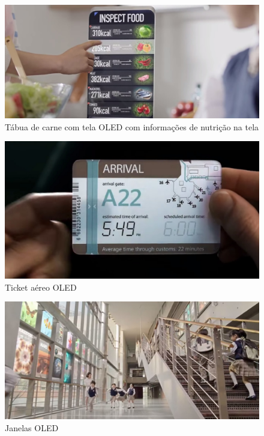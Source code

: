 \begin{figure}[!ht]
  \centering
  \includegraphics[width=.90\textwidth]{./figuras/oled-future4} 
  \caption{Tábua de carne com tela OLED com informações de nutrição na tela}
  \label{fig:oled-future4} 
\end{figure}

\begin{figure}[!ht]
  \centering
  \includegraphics[width=.90\textwidth]{./figuras/oled-future5} 
  \caption{Ticket aéreo OLED}
  \label{fig:oled-future5} 
\end{figure}

\begin{figure}[!ht]
  \centering
  \includegraphics[width=.90\textwidth]{./figuras/oled-future6} 
  \caption{Janelas OLED}
  \label{fig:oled-future6} 
\end{figure}

